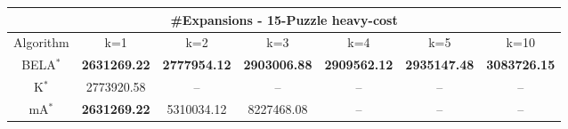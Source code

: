 \begin{tabular}{c|cccccc}\toprule
\multicolumn{7}{c}{#Expansions - 15-Puzzle heavy-cost}\\ \midrule
Algorithm & k=1 & k=2 & k=3 & k=4 & k=5 & k=10 \\ \midrule
BELA$^*$ & \textbf{2631269.22} & \textbf{2777954.12} & \textbf{2903006.88} & \textbf{2909562.12} & \textbf{2935147.48} & \textbf{3083726.15} \\
K$^*$ & 2773920.58 & -- & -- & -- & -- & -- \\
mA$^*$ & \textbf{2631269.22} & 5310034.12 & 8227468.08 & -- & -- & -- \\ \bottomrule 
\end{tabular}

